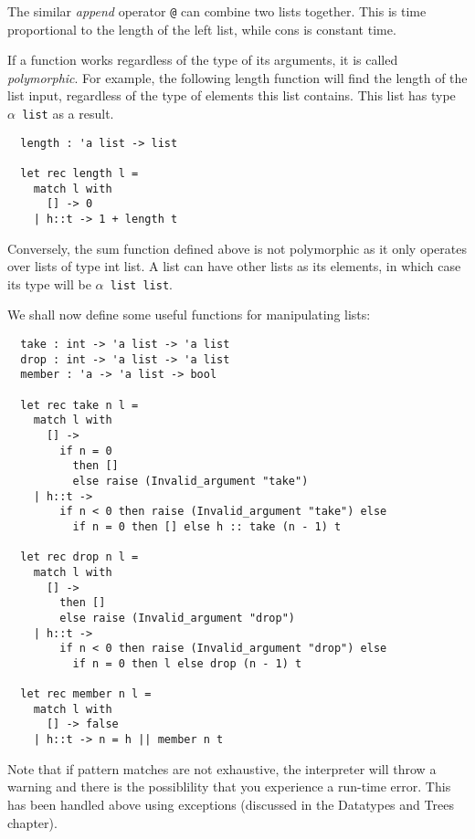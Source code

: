 \documentclass[12pt]{article}
\begin{document}
The similar \textit{append} operator \texttt{@} can combine two lists together. This is time proportional to the length of the left list,
while cons is constant time.

If a function works regardless of the type of its arguments, it is called \textit{polymorphic}. For example, the following length
function will find the length of the list input, regardless of the type of elements this list contains. This list has type \texttt{$\alpha$ list} as
a result.
\begin{lstlisting}
  length : 'a list -> list

  let rec length l =
    match l with
      [] -> 0
    | h::t -> 1 + length t
\end{lstlisting}
Conversely, the sum function defined above is not polymorphic as it only operates over lists of type int list. A list can have
other lists as its elements, in which case its type will be \texttt{$\alpha$ list list}.

We shall now define some useful functions for manipulating lists:
\begin{lstlisting}
  take : int -> 'a list -> 'a list
  drop : int -> 'a list -> 'a list
  member : 'a -> 'a list -> bool

  let rec take n l =
    match l with
      [] ->
        if n = 0
          then []
          else raise (Invalid_argument "take")
    | h::t ->
        if n < 0 then raise (Invalid_argument "take") else
          if n = 0 then [] else h :: take (n - 1) t

  let rec drop n l =
    match l with
      [] ->
        then []
        else raise (Invalid_argument "drop")
    | h::t ->
        if n < 0 then raise (Invalid_argument "drop") else
          if n = 0 then l else drop (n - 1) t

  let rec member n l =
    match l with
      [] -> false
    | h::t -> n = h || member n t
\end{lstlisting}
Note that if pattern matches are not exhaustive, the interpreter will throw a warning
and there is the possiblility that you experience a run-time error. This has been handled
above using exceptions (discussed in the Datatypes and Trees chapter).
\end{document}
